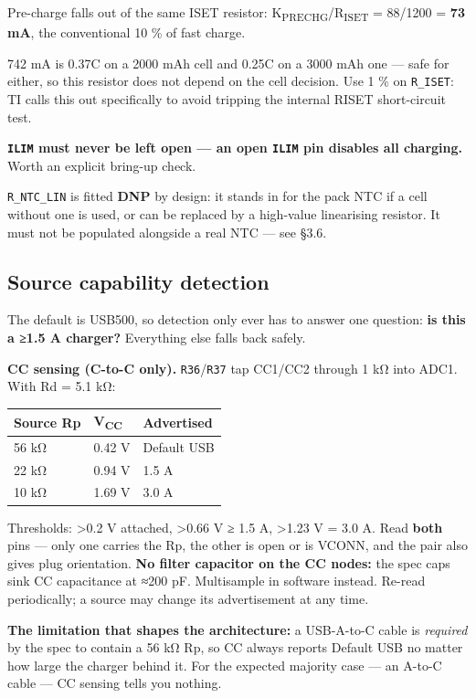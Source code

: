 \documentclass[11pt]{article}
\begin{document}
Pre-charge falls out of the same ISET resistor: K\textsubscript{PRECHG}/R\textsubscript{ISET} =
88/1200 = \textbf{73 mA}, the conventional 10 \% of fast charge.

742 mA is 0.37C on a 2000 mAh cell and 0.25C on a 3000 mAh one — safe for either, so this resistor
does not depend on the cell decision. Use 1 \% on \texttt{R_ISET}: TI calls this out specifically to
avoid tripping the internal RISET short-circuit test.

\textbf{\texttt{ILIM} must never be left open — an open \texttt{ILIM} pin disables all charging.}
Worth an explicit bring-up check.

\texttt{R_NTC_LIN} is fitted \textbf{DNP} by design: it stands in for the pack NTC if a cell without
one is used, or can be replaced by a high-value linearising resistor. It must not be populated
alongside a real NTC — see §3.6.

\subsection{Source capability detection}

The default is USB500, so detection only ever has to answer one question: \textbf{is this a ≥1.5 A
charger?} Everything else falls back safely.

\textbf{CC sensing (C-to-C only).} \texttt{R36}/\texttt{R37} tap CC1/CC2 through 1 kΩ into ADC1. With
Rd = 5.1 kΩ:

\begin{tabularx}{\linewidth}{@{}l l X@{}}
\toprule
\textbf{Source Rp} & \textbf{V\textsubscript{CC}} & \textbf{Advertised} \\
\midrule
56 kΩ & 0.42 V & Default USB \\
22 kΩ & 0.94 V & 1.5 A \\
10 kΩ & 1.69 V & 3.0 A \\
\bottomrule
\end{tabularx}

Thresholds: >0.2 V attached, >0.66 V ≥ 1.5 A, >1.23 V = 3.0 A. Read \textbf{both} pins — only one
carries the Rp, the other is open or is VCONN, and the pair also gives plug orientation. \textbf{No
filter capacitor on the CC nodes:} the spec caps sink CC capacitance at ≈200 pF. Multisample in
software instead. Re-read periodically; a source may change its advertisement at any time.

\textbf{The limitation that shapes the architecture:} a USB-A-to-C cable is \textit{required} by the
spec to contain a 56 kΩ Rp, so CC always reports Default USB no matter how large the charger behind
it. For the expected majority case — an A-to-C cable — CC sensing tells you nothing.
\end{document}
